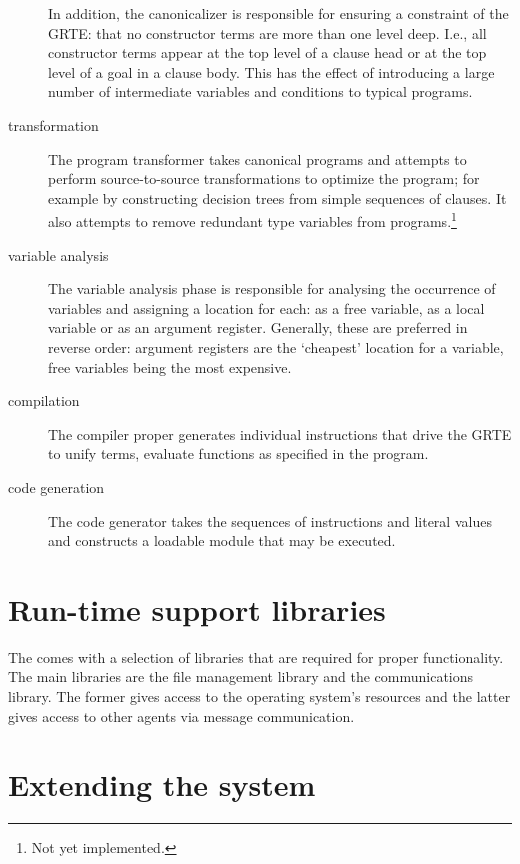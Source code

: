 \begin{description}
In addition, the canonicalizer is responsible for ensuring a constraint of the GRTE: that no constructor terms are more than one level deep. I.e., all constructor terms appear at the top level of a clause head or at the top level of a goal in a clause body. This has the effect of introducing a large number of intermediate variables and conditions to typical \go programs.

\item[transformation]
The program transformer takes canonical programs and attempts to perform source-to-source transformations to optimize the program; for example by constructing decision trees from simple sequences of clauses. It also attempts to remove redundant type variables from programs.\footnote{Not yet implemented.} 

\item[variable analysis]
The variable analysis phase is responsible for analysing the occurrence of variables and assigning a location for each: as a free variable, as a local variable or as an argument register. Generally, these are preferred in reverse order: argument registers are the `cheapest' location for a variable, free variables being the most expensive.

\item[compilation]
The compiler proper generates individual instructions that drive the GRTE to unify terms, evaluate functions as specified in the \go program.

\item[code generation]
The code generator takes the sequences of instructions and literal values and constructs a loadable module that may be executed.
\end{description}

\section{Run-time support libraries}
\label{howitworks:libraries}

The \goir comes with a selection of libraries that are required for proper functionality. The main libraries are the file management library and the communications library. The former gives access to the operating system's resources and the latter gives access to other agents via message communication.

\section{Extending the \go system}
\label{howitworks:extending}

